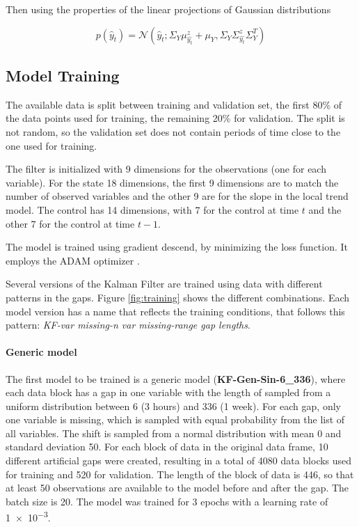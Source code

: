 \documentclass{article}
\newcommand{\norm}[3]{\mathcal{N}\left(#1; #2, #3\right)} %
\let\Oldsubsection\subsection
\renewcommand{\subsection}{\FloatBarrier\Oldsubsection}
\begin{document}
Then using the properties of the linear projections of Gaussian distributions

\begin{equation}
    p(\hat{y}_t) = \norm{\hat{y}_t}{\Sigma_Y\mu^z_{\hat{y_t}} + \mu_Y}{\Sigma_Y\Sigma^z_{\hat{y_t}}\Sigma_Y^T}
\end{equation}

\subsection{Model Training}

The available data is split between training and validation set, the first 80\% of the data points used for training, the remaining 20\% for validation. The split is not random, so the validation set does not contain periods of time close to the one used for training.

The filter is initialized with 9 dimensions for the observations (one for each variable). For the state 18 dimensions, the first 9 dimensions are to match the number of observed variables and the other 9 are for the slope in the local trend model. The control has 14 dimensions, with 7 for the control at time $t$ and the other 7 for the control at time $t-1$.

The model is trained using gradient descend, by minimizing the loss function. It employs the ADAM optimizer \cite{kingma_adam_2017}.

Several versions of the Kalman Filter are trained using data with different patterns in the gaps. Figure \ref{fig:training} shows the different combinations. Each model version has a name that reflects the training conditions, that follows this pattern: \textit{KF-\textlangle var missing\textrangle-\textlangle n var missing\textrangle-\textlangle range gap lengths}.

\paragraph{Generic model} The first model to be trained is a generic model (\textbf{KF-Gen-Sin-6\_336}), where each data block has a gap in one variable with the length of sampled from a uniform distribution between \num{6} (3 hours) and \num{336} (1 week). For each gap, only one variable is missing, which is sampled with equal probability from the list of all variables. The shift is sampled from a normal distribution with mean 0 and standard deviation 50. For each block of data in the original data frame, 10 different artificial gaps were created, resulting in a total of 4080 data blocks used for training and 520 for validation. 
The length of the block of data is \num{446}, so that at least \num{50} observations are available to the model before and after the gap. The batch size is \num{20}.
The model was trained for \num{3} epochs with a learning rate of \num{1e-3}.
\end{document}
